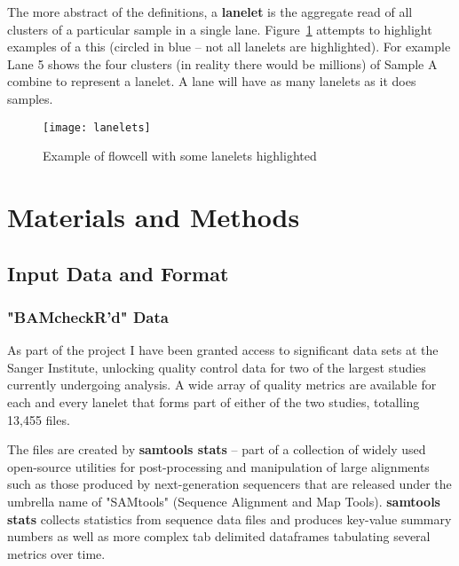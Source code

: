 
The more abstract of the definitions, a \textbf{lanelet} is the aggregate read
of all clusters of a particular sample in a single lane.
Figure~\ref{fig:lanelets} attempts to highlight examples of a this (circled in
blue -- not all lanelets are highlighted). For example Lane 5 shows the four
clusters (in reality there would be millions) of Sample A combine to
represent a lanelet. A lane will have as many lanelets as it does samples.


\begin{figure}[htbp!]
    \centering
    \texttt{[image: lanelets]}
    \caption[lanelets]{Example of flowcell with some lanelets highlighted}
    \label{fig:lanelets}
\end{figure}


\chapter{Materials and Methods}
\section{Input Data and Format}
\subsection{"BAMcheckR'd" Data}
\label{chap:bamcheckr-data}

As part of the project I have been granted access to significant data sets at the
Sanger Institute, unlocking quality control data for two of the largest studies
currently undergoing analysis. A wide array of quality metrics are available for
each and every lanelet that forms part of either of the two studies, totalling
13,455 files.


The files are created by \textbf{samtools stats} -- part of a collection of
widely used open-source utilities for post-processing and manipulation of large
alignments such as those produced by next-generation sequencers that are
released under the umbrella name of "SAMtools"\citep{samtools} (Sequence
Alignment and Map Tools). \textbf{samtools stats} collects statistics from
sequence data files and produces key-value summary numbers as well as more
complex tab delimited dataframes tabulating several metrics over time.


